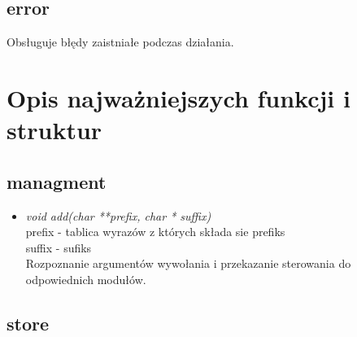 \documentclass[12pt,a4paper]{report}
\begin{document}
	\subsection*{error} Obsługuje błędy zaistniałe podczas działania.
	
\section*{Opis najważniejszych funkcji i struktur} 

	\subsection*{managment}
	
		\begin{itemize}
			
			\item \textit{void add(char **prefix, char * suffix)} \\
			prefix - tablica wyrazów z których składa sie prefiks \\
			suffix - sufiks \\
			Rozpoznanie argumentów wywołania i przekazanie sterowania do odpowiednich modułów.
			
		\end{itemize}
	
	\subsection*{store} 
	
\end{document}
